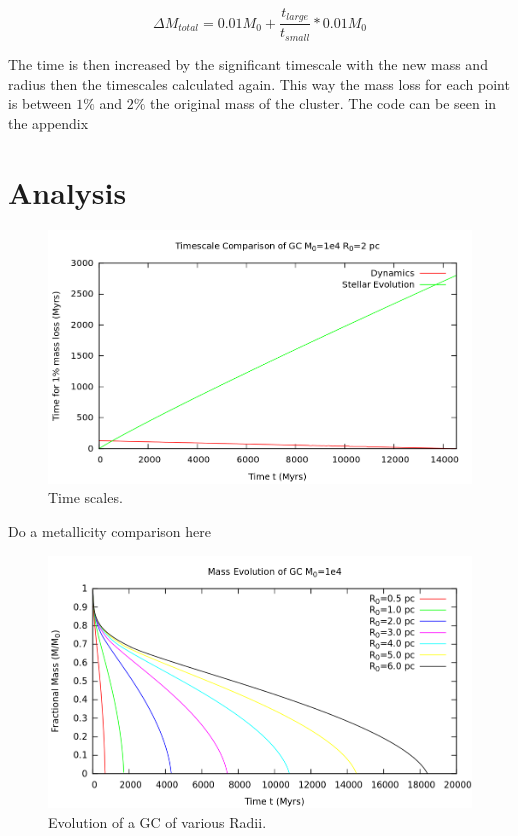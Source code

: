 \documentclass[%
 aip,
 jmp,%
 amsmath,amssymb,
 reprint,%
]{revtex4-1}
\begin{document}
\begin{equation}
  \Delta M_{total}=0.01 M_{0}+\frac{t_{large}}{t_{small}}*0.01 M_{0}
  \label{totalmassloss}
\end{equation}

The time is then increased by the significant timescale with the new mass and radius then the timescales calculated again. This way the mass loss for each point is between $1\%$ and $2\%$ the original mass of the cluster. The code can be seen in the appendix 



\section{\label{sec:level1}Analysis}

\begin{figure}[t]
\centering
\includegraphics[width=1\textwidth]{fig4.png}
\caption{Time scales. \cite{Lamers2005}}
\label{timescale}
\end{figure}

Do a metallicity comparison here 







\begin{figure}[t]
\centering
\includegraphics[width=1\textwidth]{fig2.png}
\caption{Evolution of a GC of various Radii.}
\label{constmassvarradii}
\end{figure}
\end{document}
